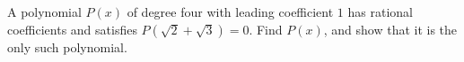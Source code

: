 A polynomial $P(x)$ of degree four with leading coefficient $1$ has rational coefficients and satisfies $P\left(\sqrt2+\sqrt3\right)=0$. Find $P(x)$, and show that it is the only such polynomial.

